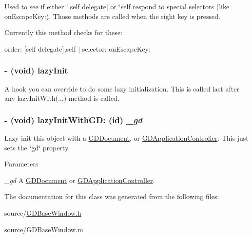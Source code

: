 Used to see if either \char`\"{}\mbox{[}self delegate\mbox{]} or \char`\"{}self respond to special selectors (like onEscapeKey:). Those methods are called when the right key is pressed.

Currently this method checks for these:


\begin{DoxyItemize}
\item order: \mbox{[}self delegate\mbox{]},self $|$ selector: onEscapeKey: 
\end{DoxyItemize}\hypertarget{interface_g_d_base_window_a6fb74f03aaa52cabb4f4492363299377}{
\subsubsection[{lazyInit}]{\setlength{\rightskip}{0pt plus 5cm}-\/ (void) lazyInit }}
\label{interface_g_d_base_window_a6fb74f03aaa52cabb4f4492363299377}


A hook you can override to do some lazy initialization. This is called last after any lazyInitWith(...) method is called. \hypertarget{interface_g_d_base_window_ab930dfe89ec95507a18c42195b2619cc}{
\subsubsection[{lazyInitWithGD:}]{\setlength{\rightskip}{0pt plus 5cm}-\/ (void) lazyInitWithGD: (id) {\em \_\-gd}}}
\label{interface_g_d_base_window_ab930dfe89ec95507a18c42195b2619cc}


Lazy init this object with a \hyperlink{interface_g_d_document}{GDDocument}, or \hyperlink{interface_g_d_application_controller}{GDApplicationController}. This just sets the \char`\"{}gd\char`\"{} property.


\begin{DoxyParams}{Parameters}
\item[{\em \_\-gd}]A \hyperlink{interface_g_d_document}{GDDocument} or \hyperlink{interface_g_d_application_controller}{GDApplicationController}. \end{DoxyParams}


The documentation for this class was generated from the following files:\begin{DoxyCompactItemize}
\item 
source/\hyperlink{_g_d_base_window_8h}{GDBaseWindow.h}\item 
source/GDBaseWindow.m\end{DoxyCompactItemize}
